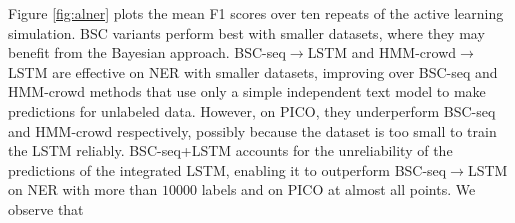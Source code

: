 %
Figure \ref{fig:alner} plots the mean F1 scores over ten repeats of the active learning simulation.
BSC variants perform best with smaller datasets, where they may benefit from the Bayesian approach. 
BSC-seq$\rightarrow$LSTM and HMM-crowd$\rightarrow$LSTM are effective on NER with smaller datasets, improving over BSC-seq and HMM-crowd methods that 
use only a simple independent text model to make predictions for unlabeled data. 
However, on PICO, they underperform BSC-seq and HMM-crowd respectively, possibly because the dataset is too small to train 
the LSTM reliably.
BSC-seq+LSTM accounts for the unreliability of the predictions of the integrated LSTM, 
enabling it to outperform BSC-seq$\rightarrow$LSTM on NER with more than $10000$ labels and on PICO at almost all points.
We observe that


